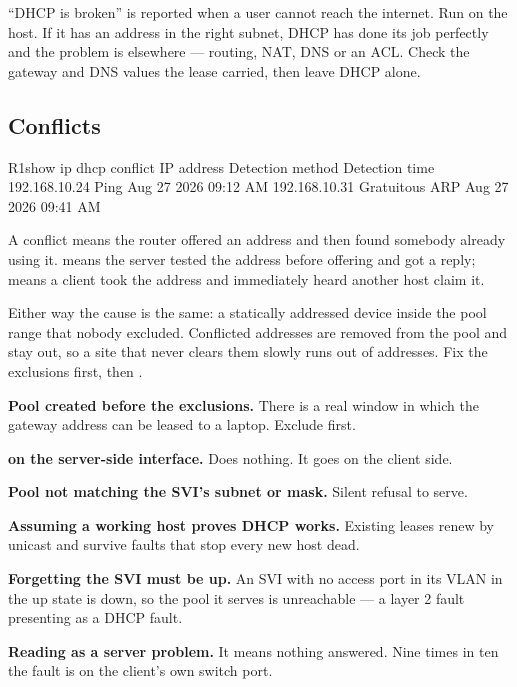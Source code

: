 \begin{alertbox}
``DHCP is broken'' is reported when a user cannot reach the internet. Run
 on the host. If it has an address in the right subnet, DHCP
has done its job perfectly and the problem is elsewhere --- routing, NAT, DNS or
an ACL. Check the gateway and DNS values the lease carried, then leave DHCP
alone.
\end{alertbox}

\subsection{Conflicts}

\begin{verify}{R1}{show ip dhcp conflict}
IP address       Detection method   Detection time
192.168.10.24    Ping               Aug 27 2026 09:12 AM
192.168.10.31    Gratuitous ARP     Aug 27 2026 09:41 AM
\end{verify}

A conflict means the router offered an address and then found somebody already
using it.  means the server tested the address before offering and got
a reply;  means a client took the address and immediately
heard another host claim it.

Either way the cause is the same: a statically addressed device inside the pool
range that nobody excluded. Conflicted addresses are removed from the pool and
stay out, so a site that never clears them slowly runs out of addresses. Fix the
exclusions first, then .

\begin{pitfall}
\begin{tight}
  \item \textbf{Pool created before the exclusions.} There is a real window in
        which the gateway address can be leased to a laptop. Exclude first.
  \item \textbf{ on the server-side interface.} Does
        nothing. It goes on the client side.
  \item \textbf{Pool  not matching the SVI's subnet or mask.} Silent
        refusal to serve.
  \item \textbf{Assuming a working host proves DHCP works.} Existing leases renew
        by unicast and survive faults that stop every new host dead.
  \item \textbf{Forgetting the SVI must be up.} An SVI with no access port in its
        VLAN in the up state is down, so the pool it serves is unreachable ---
        a layer 2 fault presenting as a DHCP fault.
  \item \textbf{Reading  as a server problem.} It means nothing
        answered. Nine times in ten the fault is on the client's own switch port.
\end{tight}
\end{pitfall}

